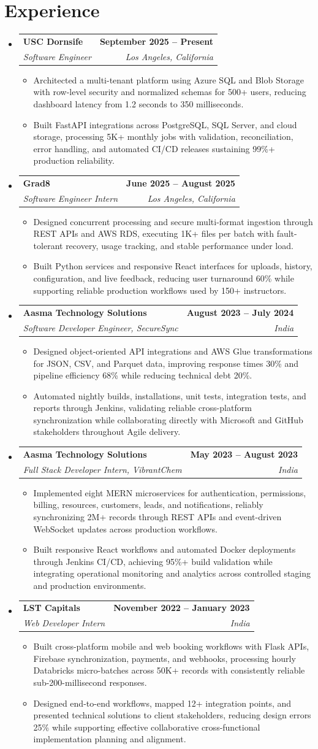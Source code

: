 \documentclass[letterpaper,10pt]{article}
\makeatletter
\newcommand{\itemTail}{\vspace{-5pt}}
\newcommand{\sectionGap}{\vspace{-8pt}}
\newcommand{\roleGap}{\vspace{2pt}}
\newcommand{\resumeItem}[1]{\item\small{{#1 \itemTail}}}
\newcommand{\resumeSubheading}[4]{\vspace{-1pt}\item\begin{tabular*}{1.0\textwidth}[t]{l@{\extracolsep{\fill}}r}\textbf{#1} & \textbf{\small #2} \\\textit{\small#3} & \textit{\small #4} \\\end{tabular*}\vspace{-2pt}}
\newcommand{\resumeSubHeadingListStart}{\begin{itemize}[leftmargin=0.0in, label={}]}
\newcommand{\resumeSubHeadingListEnd}{\end{itemize}}
\newcommand{\resumeItemListStart}{\begin{itemize}[leftmargin=0.15in,label=\textbullet,itemsep=3pt,topsep=0pt,parsep=0pt,partopsep=0pt]}
\newcommand{\resumeItemListEnd}{\end{itemize}\vspace{-4pt}}
\makeatother
\begin{document}
\section{Experience}
\resumeSubHeadingListStart
\resumeSubheading{USC Dornsife}{September 2025 -- Present}{Software Engineer}{Los Angeles, California}
\resumeItemListStart
\resumeItem{Architected a multi-tenant platform using Azure SQL and Blob Storage with row-level security and normalized schemas for 500+ users, reducing dashboard latency from 1.2 seconds to 350 milliseconds.}
\resumeItem{Built FastAPI integrations across PostgreSQL, SQL Server, and cloud storage, processing 5K+ monthly jobs with validation, reconciliation, error handling, and automated CI/CD releases sustaining 99\%+ production reliability.}
\resumeItemListEnd
\roleGap
\resumeSubheading{Grad8}{June 2025 -- August 2025}{Software Engineer Intern}{Los Angeles, California}
\resumeItemListStart
\resumeItem{Designed concurrent processing and secure multi-format ingestion through REST APIs and AWS RDS, executing 1K+ files per batch with fault-tolerant recovery, usage tracking, and stable performance under load.}
\resumeItem{Built Python services and responsive React interfaces for uploads, history, configuration, and live feedback, reducing user turnaround 60\% while supporting reliable production workflows used by 150+ instructors.}
\resumeItemListEnd
\roleGap
\resumeSubheading{Aasma Technology Solutions}{August 2023 -- July 2024}{Software Developer Engineer, SecureSync}{India}
\resumeItemListStart
\resumeItem{Designed object-oriented API integrations and AWS Glue transformations for JSON, CSV, and Parquet data, improving response times 30\% and pipeline efficiency 68\% while reducing technical debt 20\%.}
\resumeItem{Automated nightly builds, installations, unit tests, integration tests, and reports through Jenkins, validating reliable cross-platform synchronization while collaborating directly with Microsoft and GitHub stakeholders throughout Agile delivery.}
\resumeItemListEnd
\roleGap
\resumeSubheading{Aasma Technology Solutions}{May 2023 -- August 2023}{Full Stack Developer Intern, VibrantChem}{India}
\resumeItemListStart
\resumeItem{Implemented eight MERN microservices for authentication, permissions, billing, resources, customers, leads, and notifications, reliably synchronizing 2M+ records through REST APIs and event-driven WebSocket updates across production workflows.}
\resumeItem{Built responsive React workflows and automated Docker deployments through Jenkins CI/CD, achieving 95\%+ build validation while integrating operational monitoring and analytics across controlled staging and production environments.}
\resumeItemListEnd
\roleGap
\resumeSubheading{LST Capitals}{November 2022 -- January 2023}{Web Developer Intern}{India}
\resumeItemListStart
\resumeItem{Built cross-platform mobile and web booking workflows with Flask APIs, Firebase synchronization, payments, and webhooks, processing hourly Databricks micro-batches across 50K+ records with consistently reliable sub-200-millisecond responses.}
\resumeItem{Designed end-to-end workflows, mapped 12+ integration points, and presented technical solutions to client stakeholders, reducing design errors 25\% while supporting effective collaborative cross-functional implementation planning and alignment.}
\resumeItemListEnd
\resumeSubHeadingListEnd
\sectionGap
\end{document}
